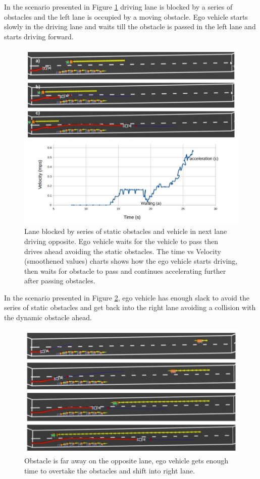 In the scenario presented in Figure \ref{series_obstacles} driving lane is blocked by a series of obstacles and the left lane is occupied by a moving obstacle. Ego vehicle starts slowly in the driving lane and waits till the obstacle is passed in the left lane and starts driving forward. 
\begin{figure}
    \centering
    \includegraphics[width=1.0\textwidth]{Images/evaluation/vehicle_opp_1.jpg}
    \caption{Lane blocked by series of static obstacles and vehicle in next lane driving opposite. Ego vehicle waits for the vehicle to pass then drives ahead avoiding the static obstacles. The time vs Velocity (smoothened values) charts shows how the ego vehicle starts driving, then waits for obstacle to pass and continues accelerating further after passing obstacles.}
    \label{series_obstacles}
\end{figure}

In the scenario presented in Figure \ref{series_obstacles_2}, ego vehicle has enough slack to avoid the series of static obstacles and get back into the right lane avoiding a collision with the dynamic obstacle ahead. 

\begin{figure}
	\centering
	\includegraphics[width=1.0\textwidth]{Images/evaluation/vehicle_opp_2.jpg}
	\caption{Obstacle is far away on the opposite lane, ego vehicle gets enough time to overtake the obstacles and shift into right lane.}
	\label{series_obstacles_2}
\end{figure}

